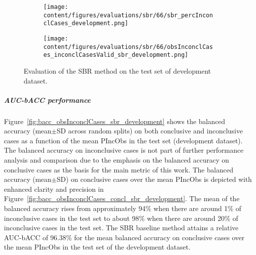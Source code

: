\begin{figure}[ht]
  \begin{subfigure}{0.48\textwidth}
    \centering
    \texttt{[image: content/figures/evaluations/sbr/66/sbr\_percInconclCases\_development.png]}
    \label{fig:sbr_percInconclCases_development}
  \end{subfigure}
  \hfill
  \begin{subfigure}{0.495\textwidth}
    \centering
    \texttt{[image: content/figures/evaluations/sbr/66/obsInconclCases\_inconclCasesValid\_sbr\_development.png]}
    \label{fig:obsInconclCases_inconclCasesValid_sbr_development}
  \end{subfigure}

  \caption{Evaluation of the SBR method on the test set of development dataset.}
  \label{fig:}
\end{figure}

\subparagraph{AUC-bACC performance}

Figure~\ref{fig:bacc_obsInconclCases_sbr_development} shows the balanced accuracy (mean$\pm$SD across random splits) 
on both conclusive and inconclusive cases as a function of the mean PIncObs
in the test set (development dataset).
The balanced accuracy on inconclusive cases is not part of further performance analysis and comparison 
due to the emphasis on the balanced accuracy on conclusive cases as the basis for the main metric of this work.
The balanced accuracy (mean$\pm$SD) on conclusive cases over the mean PIncObs
is depicted with enhanced clarity and precision in Figure~\ref{fig:bacc_obsInconclCases_concl_sbr_development}.
The mean of the balanced accuracy rises from approximately 94\% 
when there are around 1\% of inconclusive cases in the test set to about 98\% 
when there are around 20\% of inconclusive cases in the test set.
The SBR baseline method attains a relative AUC-bACC of 96.38\% for the mean balanced accuracy on conclusive cases
over the mean PIncObs in the test set of the development dataset.

